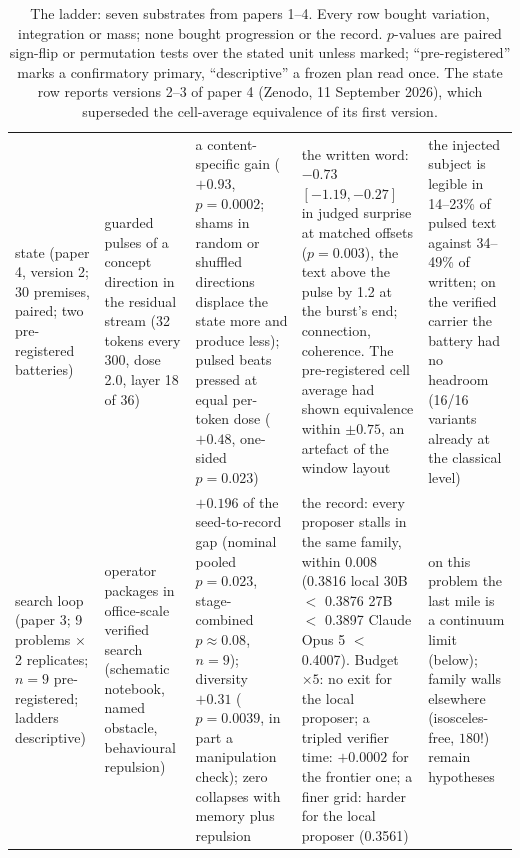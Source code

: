 \documentclass[11pt]{article}
\begin{document}
\begin{table}[p]
\begin{tabular}{R{2.0cm} R{2.7cm} R{3.6cm} R{3.3cm} R{3.3cm}}
state (paper 4, version 2; 30 premises, paired; two pre-registered batteries) & guarded pulses of a concept direction in the residual stream (32 tokens every 300, dose 2.0, layer 18 of 36) & a content-specific gain ($+0.93$, $p=0.0002$; shams in random or shuffled directions displace the state more and produce less); pulsed beats pressed at equal per-token dose ($+0.48$, one-sided $p=0.023$) & the written word: $-0.73$ $[-1.19,-0.27]$ in judged surprise at matched offsets ($p=0.003$), the text above the pulse by 1.2 at the burst's end; connection, coherence. The pre-registered cell average had shown equivalence within $\pm0.75$, an artefact of the window layout & the injected subject is legible in 14--23\% of pulsed text against 34--49\% of written; on the verified carrier the battery had no headroom (16/16 variants already at the classical level) \\
search loop (paper 3; 9 problems $\times$ 2 replicates; $n=9$ pre-registered; ladders descriptive) & operator packages in office-scale verified search (schematic notebook, named obstacle, behavioural repulsion) & $+0.196$ of the seed-to-record gap (nominal pooled $p=0.023$, stage-combined $p\approx0.08$, $n=9$); diversity $+0.31$ ($p=0.0039$, in part a manipulation check); zero collapses with memory plus repulsion & the record: every proposer stalls in the same family, within 0.008 (0.3816 local 30B $<$ 0.3876 27B $<$ 0.3897 Claude Opus 5 $<$ 0.4007). Budget $\times5$: no exit for the local proposer; a tripled verifier time: $+0.0002$ for the frontier one; a finer grid: harder for the local proposer (0.3561) & on this problem the last mile is a continuum limit (below); family walls elsewhere (isosceles-free, $180!$) remain hypotheses \\
\bottomrule
\end{tabular}
\caption{The ladder: seven substrates from papers 1--4. Every row bought
variation, integration or mass; none bought progression or the record.
$p$-values are paired sign-flip or permutation tests over the stated unit
unless marked; ``pre-registered'' marks a confirmatory primary, ``descriptive''
a frozen plan read once. The state row reports versions 2--3 of paper 4
(Zenodo, 11 September 2026), which superseded the cell-average equivalence
of its first version.}
\label{tab:ladder}
\end{table}
\end{document}

